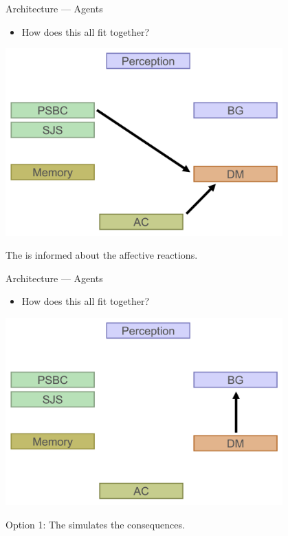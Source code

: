    \begin{frame}{Architecture --- Agents}
      \begin{itemize}
         \item {How does this all fit together?}
      \end{itemize}
      
      \begin{center}
         \includegraphics[width=0.8\textwidth]{plan_2.png}
      \end{center}
      
      The  is informed about the affective reactions.
   \end{frame}
   
   \begin{frame}{Architecture --- Agents}
      \begin{itemize}
         \item {How does this all fit together?}
      \end{itemize}
      
      \begin{center}
         \includegraphics[width=0.8\textwidth]{plan_3.png}
      \end{center}
      
      Option 1: The  simulates the consequences.
   \end{frame}
   
